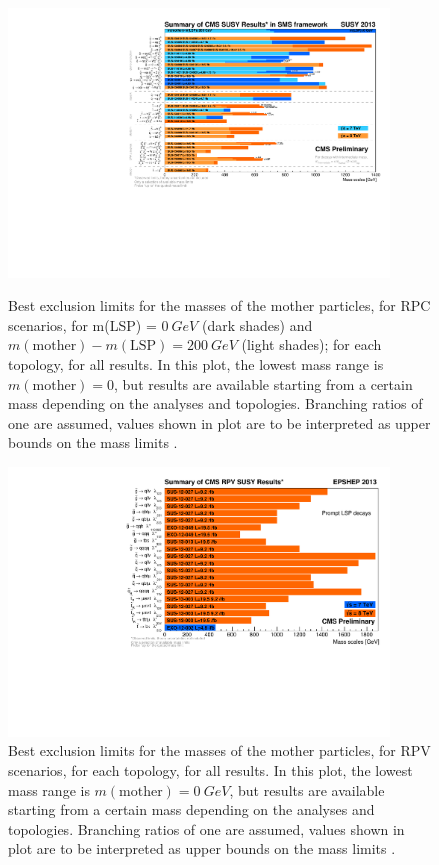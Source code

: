 \begin{figure}
	\centering
	\includegraphics[width=0.9\textwidth]{Images/Introduction/barplot_blue_orange_SUSY2013.pdf}
	\caption{Best exclusion limits for the masses of the mother particles, for RPC scenarios, for m(LSP) = $0~\si{GeV}$ (dark shades) and $m(\text{mother}) - m(\text{LSP}) = 200~\si{GeV}$ (light shades); for each topology, for all results. In this plot, the lowest mass range is $m(\text{mother})=0$, but results are available starting from a certain mass depending on the analyses and topologies. Branching ratios of one are assumed, values shown in plot are to be interpreted as upper bounds on the mass limits \cite{cms_results}.}
	\label{fig:MODEL_DEPENDENT_1}

	\includegraphics[width=0.9\textwidth]{Images/Introduction/RPVbarplot_blue_orange_EPSHEP2013.pdf}
	\caption{Best exclusion limits for the masses of the mother particles, for RPV scenarios, for each topology, for all results. In this plot, the lowest mass range is $m(\text{mother})=0~\si{GeV}$, but results are available starting from a certain mass depending on the analyses and topologies. Branching ratios of one are assumed, values shown in plot are to be interpreted as upper bounds on the mass limits \cite{cms_results}.}
	\label{fig:MODEL_DEPENDENT_2}
\end{figure}

